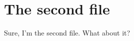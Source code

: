 \documentclass{article}
\begin{document}
\section{The second file}
Sure, I'm the second file. What about it?
\end{document}
